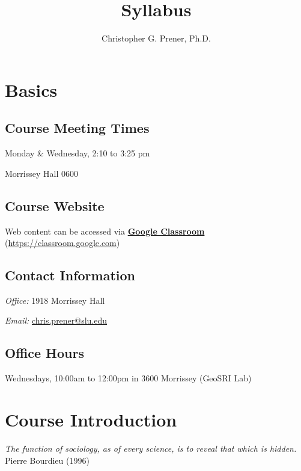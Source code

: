 \documentclass{tufte-book}
\title{Syllabus}
\author{Christopher G. Prener, Ph.D.}
\begin{document}
\maketitle %
\chapter{Basics}
\section{Course Meeting Times}
Monday \& Wednesday, 2:10 to 3:25 pm
\par \noindent Morrissey Hall 0600

\vspace{6mm}
\section{Course Website}
Web content can be accessed via \textbf{\href{https://classroom.google.com}{Google Classroom}} (\href{https://classroom.google.com}{https://classroom.google.com})

\vspace{6mm}
\section{Contact Information}
\textit{Office:} 1918 Morrissey Hall
\par \noindent \textit{Email:} \href{mailto:chris.prener@slu.edu}{chris.prener@slu.edu}

\vspace{6mm}
\section{Office Hours}
Wednesdays, 10:00am to 12:00pm in 3600 Morrissey (GeoSRI Lab)

\chapter{Course Introduction}
\vspace{2mm}
\begin{fullwidth}
\textit{The function of sociology, as of every science, is to reveal that which is hidden.} \\
\noindent Pierre Bourdieu (1996)
\end{fullwidth}
\vspace{2mm}
\end{document}
